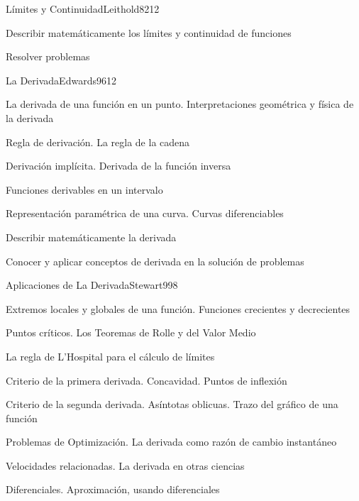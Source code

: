 \begin{syllabus}
\begin{unit}{Límites y Continuidad}{Leithold82}{12}
   \begin{learningoutcomes}
      \item Describir matemáticamente los límites y continuidad de funciones
	\item Resolver problemas
   \end{learningoutcomes}
\end{unit}

\begin{unit}{La Derivada}{Edwards96}{12}
\begin{topics}
	\item La derivada de una función en un punto. Interpretaciones geométrica y física de la derivada
	\item Regla de derivación. La regla de la cadena
	\item Derivación implícita. Derivada de la función inversa
	\item Funciones derivables en un intervalo
	\item Representación paramétrica de una curva. Curvas diferenciables
\end{topics}

\begin{learningoutcomes}
	\item Describir matemáticamente la derivada
	\item Conocer y aplicar conceptos de derivada en la solución de problemas
\end{learningoutcomes}
\end{unit}

\begin{unit}{Aplicaciones de La Derivada}{Stewart99}{8}
\begin{topics}
	\item Extremos locales y globales de una función. Funciones crecientes y decrecientes
	\item Puntos críticos. Los Teoremas de Rolle y del Valor Medio
	\item La regla de L'Hospital para el cálculo de límites
	\item Criterio de la primera derivada. Concavidad. Puntos de inflexión
	\item Criterio de la segunda derivada. Asíntotas oblicuas. Trazo del gráfico de una función
	\item Problemas de Optimización. La derivada como razón de cambio instantáneo
	\item Velocidades relacionadas. La derivada en otras ciencias
	\item Diferenciales. Aproximación, usando diferenciales
\end{topics}


\end{unit}
\end{syllabus}

